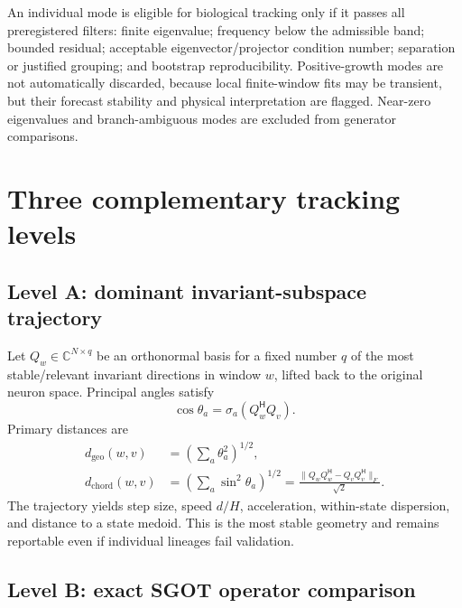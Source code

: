\documentclass[11pt,a4paper]{article}
\newcommand{\Hh}{^{\mathsf H}}
\newcommand{\C}{\mathbb{C}}
\begin{document}
An individual mode is eligible for biological tracking only if it passes all preregistered filters: finite eigenvalue; frequency below the admissible band; bounded residual; acceptable eigenvector/projector condition number; separation or justified grouping; and bootstrap reproducibility. Positive-growth modes are not automatically discarded, because local finite-window fits may be transient, but their forecast stability and physical interpretation are flagged. Near-zero eigenvalues and branch-ambiguous modes are excluded from generator comparisons.

\section{Three complementary tracking levels}

\subsection{Level A: dominant invariant-subspace trajectory}

Let $Q_w\in\C^{N\times q}$ be an orthonormal basis for a fixed number $q$ of the most stable/relevant invariant directions in window $w$, lifted back to the original neuron space. Principal angles satisfy
\begin{equation}
  \cos\theta_a=\sigma_a(Q_w\Hh Q_v).
\end{equation}
Primary distances are
\begin{align}
 d_{\mathrm{geo}}(w,v)&=\left(\sum_a\theta_a^2\right)^{1/2},\\
 d_{\mathrm{chord}}(w,v)&=\left(\sum_a\sin^2\theta_a\right)^{1/2}
 =\frac{\|Q_wQ_w\Hh-Q_vQ_v\Hh\|_F}{\sqrt2}.
\end{align}
The trajectory yields step size, speed $d/H$, acceleration, within-state dispersion, and distance to a state medoid. This is the most stable geometry and remains reportable even if individual lineages fail validation.

\subsection{Level B: exact SGOT operator comparison}
\end{document}
